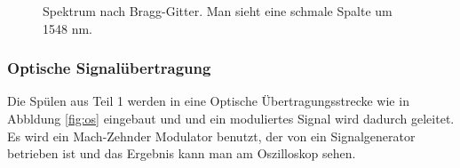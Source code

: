\documentclass[a4paper]{article}
\begin{document}
\begin{figure}[H]
  \centering
  \caption{Spektrum nach Bragg-Gitter. Man sieht eine schmale Spalte um 1548
  nm.}
  \label{fig:bragg}
\end{figure}

\subsubsection{Optische Signalübertragung}

Die Spülen aus Teil 1 werden in eine Optische Übertragungsstrecke wie in
Abbldung \ref{fig:os} eingebaut und und ein moduliertes Signal wird dadurch
geleitet. Es wird ein Mach-Zehnder Modulator benutzt, der von ein
Signalgenerator betrieben ist und das Ergebnis kann man am Oszilloskop sehen.
\end{document}
